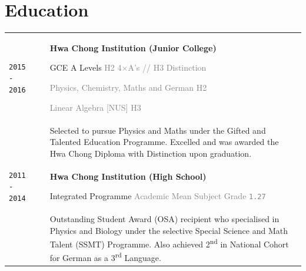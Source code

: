 \documentclass[11pt]{article}
\newcommand{\nummer}[1]{\texttt{\large #1}}
\begin{document}
\vspace{1.5cm}

\section{\textcolor{section_1}{Education}}
\vspace{-\baselineskip}
{
	\renewcommand{\arraystretch}{2}
	\begin{tabularx}{\textwidth}{@{}l p{0.3cm} X@{}}
		\texttt{\large 2015 - 2016} & & \textbf{Hwa Chong Institution (Junior College)}\par GCE A Levels \hfill \textcolor{gray}{H2 4$\times$A's // H3 Distinction}\par \hfill \textcolor{gray}{{\scriptsize Physics, Chemistry, Maths and German} \hspace{1em} H2}\par \hfill \textcolor{gray}{{\scriptsize Linear Algebra [NUS]} \hspace{1em} H3} \\[-0.5em]
		&& {\small Selected to pursue Physics and Maths under the Gifted and Talented Education Programme. Excelled and was awarded the Hwa Chong Diploma with Distinction upon graduation.} \\
		\texttt{\large 2011 - 2014} & & \textbf{Hwa Chong Institution (High School)} \par Integrated Programme \hfill \textcolor{gray}{{\scriptsize Academic Mean Subject Grade} \nummer{\large 1.27}} \\[-0.5em]
		&& {\small Outstanding Student Award {\footnotesize (OSA)} recipient who specialised in Physics and Biology under the selective Special Science and Math Talent {\footnotesize (SSMT)} Programme. Also achieved 2\textsuperscript{nd} in National Cohort for German as a 3\textsuperscript{rd} Language.} %
	\end{tabularx}
}
\end{document}
